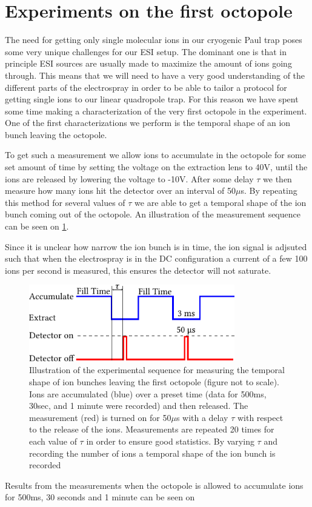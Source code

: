 \section{Experiments on the first octopole}
\label{sec:octopoleExperiments}
The need for getting only single molecular ions in our cryogenic Paul trap poses some very unique challenges for our ESI setup. The dominant one is that in principle ESI sources are usually made to maximize the amount of ions going through. This means that we will need to have a very good understanding of the different parts of the electrospray in order to be able to tailor a protocol for getting single ions to our linear quadropole trap.
For this reason we have spent some time making a characterization of the very first octopole in the experiment. One of the first characterizations we perform is the temporal shape of an ion bunch leaving the octopole.

To get such a measurement we allow ions to accumulate in the octopole for some set amount of time by setting the voltage on the extraction lens to 40V, until the ions are released by lowering the voltage to -10V. After some delay $\tau$ we then measure how many ions hit the detector over an interval of 50$\mu$s. By repeating this method for several values of $\tau$ we are able to get a temporal shape of the ion bunch coming out of the octopole.
An illustration of the measurement sequence can be seen on \cref{fig:sequenceShape}. 

Since it is unclear how narrow the ion bunch is in time, the ion signal is adjsuted such that when the electrospray is in the DC configuration a current of a few 100 ions per second is measured, this ensures the detector will not saturate.
\begin{figure}
    \centering
    \includegraphics[width = 0.8\textwidth]{main/ShapePulse.pdf}
    \caption{Illustration of the experimental sequence for measuring the temporal shape of ion bunches leaving the first octopole (figure not to scale). Ions are accumulated (blue) over a preset time (data for 500ms, 30sec, and 1 minute were recorded) and then released. The measurement (red) is turned on for 50$\mu$s with a delay $\tau$ with respect to the release of the ions.
    Measurements are repeated 20 times for each value of $\tau$ in order to ensure good statistics. By varying $\tau$ and recording the number of ions a temporal shape of the ion bunch is recorded}
    \label{fig:sequenceShape}
\end{figure}

Results from the measurements when the octopole is allowed to accumulate ions for 500ms, 30 seconds and 1 minute can be seen on 